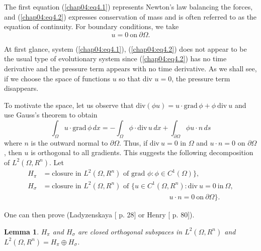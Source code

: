 \documentclass{surv-l}
\theoremstyle{plain}
\newtheorem{lemma}[theorem]{Lemma}
\theoremstyle{definition}
\numberwithin{equation}{section}
\numberwithin{figure}{chapter}
\begin{document}
The first equation (\ref{chap04:eq4.1}) represents Newton's law balancing the forces, and (\ref{chap04:eq4.2}) expresses conservation of mass and is often referred to as the equation of continuity. For boundary conditions, we take
\begin{equation}\label{chap04:eq4.3}
u=0\ \mathrm{on}\ \partial\Omega.
\end{equation}

At first glance, system (\ref{chap04:eq4.1}), (\ref{chap04:eq4.2}) does not appear to be the usual type of evolutionary system since (\ref{chap04:eq4.2}) has no time derivative and the pressure term appears with no time derivative. As we shall see, if we choose the space of functions $u$ so that div $u=0$, the pressure term disappears.

To motivate the space, let us observe that $\mathrm{div}(\phi u)=u \cdot \mathrm{grad}\, \phi +\phi\ \mathrm{div}\ u$ and use Gauss's theorem to obtain
\begin{equation*}
\int_{\Omega}u\cdot\mathrm{grad}\,\phi\, dx=-\int_{\Omega}\phi\cdot\mathrm{div}\,u\, dx+\int_{\partial\Omega}\phi u\cdot n\,ds
\end{equation*}
where $n$ is the outward normal to $\partial\Omega$. Thus, if $\mathrm{div}\ u=0$ in $\Omega$ and $u\cdot n=0$ on $\partial\Omega$, then $u$ is orthogonal to all gradients. This suggests the following decomposition of $L^{2}(\Omega, R^{n})$. Let
\begin{align*}
H_{\pi}&=\text{closure in }L^{2}(\Omega,R^{n}) \text{ of grad } \phi\!:\phi\in C^{1}(\Omega)\},\\
H_{\sigma}&=\text{closure in }L^{2}(\Omega,R^{n})\text{ of }\{u\in C^{1}(\Omega, R^{n}):\mathrm{div}\ u=0\  \mathrm{in}\ \Omega,\\
&\qquad \qquad \qquad \qquad \qquad \qquad \qquad \qquad \qquad u\cdot n=0\ \mathrm{on}\ \partial\Omega\}.
\end{align*}

One can then prove (Ladyzenskaya [\citeyear{1963l} p. 28] or Henry [\citeyear{1981henry} p. 80]).

\begin{lemma}\label{lem4.4.1} $H_{\pi}$ and $H_{\sigma}$ are closed orthogonal subspaces in $L^{2}(\Omega,R^{n})$ and $L^{2}(\Omega, R^{n})=H_{\pi}\oplus H_{\sigma}$.
\end{lemma}
\end{document}
